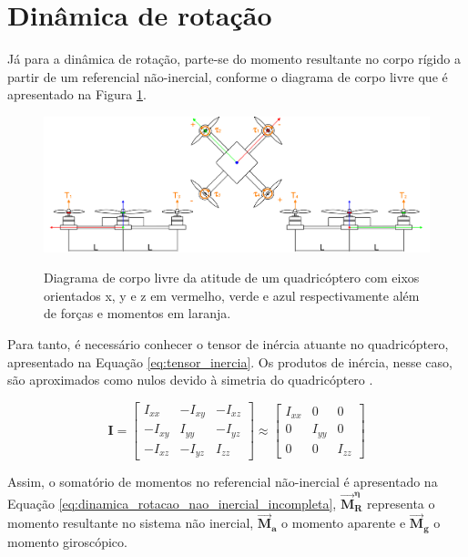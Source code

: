 \documentclass[main.tex]{subfiles}
\begin{document}
\section{Dinâmica de rotação}

Já para a dinâmica de rotação, parte-se do momento resultante no corpo rígido a partir de um referencial não-inercial, conforme o diagrama de corpo livre que é apresentado na Figura \ref{fig:attitude_dcl}.

\begin{figure}[!h]
	\centering
	\caption{Diagrama de corpo livre da atitude de um quadricóptero com eixos orientados x, y e z em vermelho, verde e azul respectivamente além de forças e momentos em laranja.}
	\includegraphics[width=1\textwidth]{capitulos/modelagem/imgs/attitude_dcl.png}
	\label{fig:attitude_dcl}
\end{figure}

Para tanto, é necessário conhecer o tensor de inércia atuante no quadricóptero, apresentado na Equação \ref{eq:tensor_inercia}. Os produtos de inércia, nesse caso, são aproximados como nulos devido à simetria do quadricóptero \cite{justificativa_inercia}.

\begin{equation}\label{eq:tensor_inercia}
	\boldsymbol{I} = \begin{bmatrix}
		I_{xx} & -I_{xy} & -I_{xz}\\
		-I_{xy} &  I_{yy} & -I_{yz}\\
		-I_{xz} & -I_{yz} & I_{zz}
	\end{bmatrix} \approx \begin{bmatrix}
	I_{xx} 	& 0 		& 0\\
	0 		&  I_{yy} 	& 0\\
	0 		& 0 		& I_{zz}
	\end{bmatrix}
\end{equation}

Assim, o somatório de momentos no referencial não-inercial é apresentado na Equação \ref{eq:dinamica_rotacao_nao_inercial_incompleta}, $	\boldsymbol{\vec{M}^\eta_R}$ representa o momento resultante no sistema não inercial, $\boldsymbol{\vec{M}_a}$ o momento aparente e $\boldsymbol{\vec{M}_g}$ o momento giroscópico.
\end{document}
